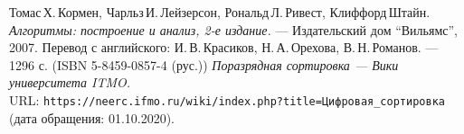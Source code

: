 \begin{thebibliography}{99}
Томас\,Х.\,Кормен, Чарльз\,И.\,Лейзерсон, Рональд\,Л.\,Ривест, Клиффорд\,Штайн.
{\itshape Алгоритмы: построение и анализ, 2-е издание.} --- Издательский дом \enquote{Вильямс}, 2007. Перевод с английского: И.\,В.\,Красиков, Н.\,А.\,Орехова, В.\,Н.\,Романов. --- 1296 с. (ISBN 5-8459-0857-4 (рус.))
{\itshape Поразрядная сортировка — Вики университета ITMO.} \\URL: \texttt{https://neerc.ifmo.ru/wiki/index.php?title=Цифровая\_сортировка} (дата обращения: 01.10.2020).
\end{thebibliography}
\pagebreak
